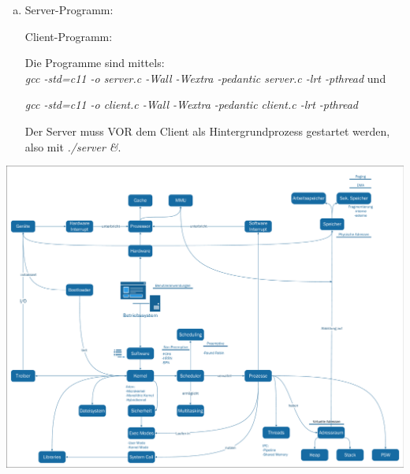 \documentclass[numbers=noendperiod]{scrartcl}
\begin{document}
\begin{enumerate}[a)]
	\item Server-Programm:
	
	
	Client-Programm:
	
	
	Die Programme sind mittels:\\
	
	\textit{gcc -std=c11 -o server.c -Wall -Wextra -pedantic server.c -lrt -pthread} und
	
	\textit{gcc -std=c11 -o client.c -Wall -Wextra -pedantic client.c -lrt -pthread}
	
	Der Server muss VOR dem Client als Hintergrundprozess gestartet werden, also mit \textit{./server \&}.
\end{enumerate}

\newpage

\includegraphics[width=\textwidth,page=1,trim={2 2 2 4},clip]{mindmap.pdf}
\end{document}

